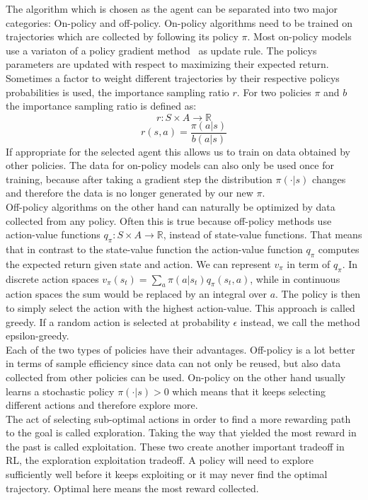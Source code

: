 \documentclass{article}
\begin{document}
\noindent The algorithm which is chosen as the agent can be
separated into two major categories: On-policy and off-policy. On-policy algorithms need
to be trained on trajectories which are collected by following its policy $\pi$. Most on-policy
models use a variaton of a policy gradient method~\cite{NIPS1999_464d828b} as update rule. The policys parameters are updated
with respect to maximizing their expected return. Sometimes a factor to weight different trajectories by their respective policys probabilities
is used, the importance sampling ratio $r$. For two policies $\pi$ and $b$ the importance sampling ratio is defined as:
\begin{equation}
    r : S\times A \xrightarrow{} \mathbb{R}
\end{equation}
\begin{equation*}
    r(s, a) = \frac{\pi(a|s)}{b(a|s)}
\end{equation*}
If appropriate for the selected agent this allows us to train on data obtained by other policies. The data for
on-policy models can also only be used once for training, because after taking a gradient step the distribution $\pi(\cdot|s)$ changes
and therefore the data is no longer generated by our new $\pi$.\\
Off-policy algorithms on the other hand can naturally be optimized
by data collected from any policy. Often this is true because off-policy methods use 
action-value functions $q_\pi : S\times A \xrightarrow{} \mathbb{R}$, 
instead of state-value functions. 
That means that in contrast to the state-value function the action-value function $q_\pi$
computes the expected return given state and action.
We can represent $v_\pi$ in term of $q_\pi$.
In discrete action spaces $v_\pi(s_t) = \sum_a \pi(a|s_t)
q_\pi(s_t, a)$, while in continuous action spaces the sum would be replaced by an integral over $a$.
The policy is then to simply select the action with the highest action-value. This approach is called greedy.
If a random action is selected at probability $\epsilon$ instead, we call the method epsilon-greedy.\\
Each of the two types of policies have their advantages. Off-policy is a lot better in terms of
sample efficiency since data can not only be reused, but also data collected from other policies can be used.
On-policy on the other hand usually learns a stochastic policy $\pi(\cdot|s) > 0$ which means that it keeps
selecting different actions and therefore explore more.\\
The act of selecting sub-optimal actions in order to find a more rewarding path to the goal is called exploration.
Taking the way that yielded the most reward in the past is called exploitation. These two create another
important tradeoff in RL, the exploration exploitation tradeoff. A policy will need to explore
sufficiently well before it keeps exploiting or it may never find the optimal trajectory. Optimal here means
the most reward collected.
\end{document}
